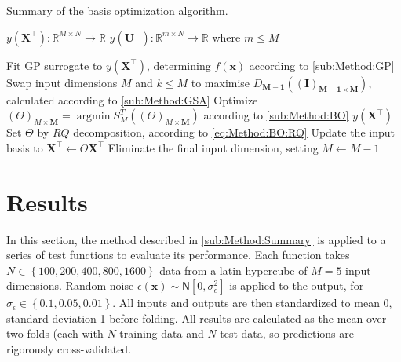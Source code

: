 \documentclass[preprint,12pt]{elsarticle}
\newcommand*{\M}[1]{\ensuremath{#1}\xspace}
\newcommand*{\vr}[1]{\M{\mathbf{#1}}}
\newcommand*{\st}[1]{\M{\mathbb{#1}}}
\newcommand*{\gauss}[2]{\mathsf{N}\!\left\lbrack{} #1 , #2 \right\rbrack}
\newcommand*{\set}[1]{\M{\left\lbrace#1\right\rbrace}}
\DeclareMathOperator*{\argmin}{argmin}
\begin{document}
            \begin{algorithm} \label{al:Method:BO}
            \caption{Summary of the basis optimization algorithm.}
                \begin{algorithmic}[1]
                    \REQUIRE $y(\vr{X}^{\intercal}) \colon \st{R}^{M\times N} \rightarrow \st{R}$
                    \ENSURE $y(\vr{U}^{\intercal}) \colon \st{R}^{m\times N} \rightarrow \st{R}$ where $m \leq M $

                    \LOOP
                        \STATE Fit GP surrogate to $y(\vr{X}^{\intercal})$, determining $\bar{f}(\vr{x})$ according to \cref{sub:Method:GP}
                        \STATE Swap input dimensions $M$ and $k\leq M$ to maximise $D_{\vr{M-1}}((\vr{I})_{\vr{M-1}\times\vr{M}})$, calculated according to \cref{sub:Method:GSA}
                        \STATE Optimize
                        $ (\Theta)_{M\times\vr{M}} = \argmin S^{T}_{M}((\Theta)_{M\times\vr{M}}) $
                        according to \cref{sub:Method:BO}
                            \RETURN $y(\vr{X}^{\intercal})$
                        \ENDIF
                        \STATE Set $\Theta$ by $RQ$ decomposition, according to \cref{eq:Method:BO:RQ}
                        \STATE Update the input basis to $\vr{X}^{\intercal} \leftarrow \Theta \vr{X}^{\intercal}$
                        \STATE Eliminate the final input dimension, setting $M \leftarrow M-1$
                    \ENDLOOP
                \end{algorithmic}
            \end{algorithm}

                       
    \section{Results} \label{sec:Results}
        In this section, the method described in \cref{sub:Method:Summary} is applied to a series of test functions to evaluate its performance. Each function takes $N \in \set{100, 200, 400, 800, 1600}$ data from a latin hypercube of $M=5$ input dimensions. Random noise $\epsilon(\vr{x}) \sim \gauss{0}{\sigma_{\epsilon}^{2}}$ is applied to the output, for $\sigma_{\epsilon} \in \set{0.1, 0.05, 0.01}$. All inputs and outputs are then standardized to mean 0, standard deviation 1 before folding.
        All results are calculated as the mean over two folds (each with $N$ training data and $N$ test data, so predictions are rigorously cross-validated. 
\end{document}
